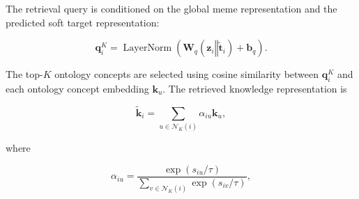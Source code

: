 \documentclass[11pt]{article}
\begin{document}
The retrieval query is conditioned on the global meme representation
and the predicted soft target representation:

\begin{equation}
\mathbf{q}^{K}_i
=
\operatorname{LayerNorm}
\left(
\mathbf{W}_{q}
\left(
\mathbf{z}_i
\mathbin{\Vert}
\widetilde{\mathbf{t}}_i
\right)
+
\mathbf{b}_{q}
\right).
\label{eq:retrieval-query}
\end{equation}

The top-$K$ ontology concepts are selected using cosine similarity
between $\mathbf{q}^{K}_i$ and each ontology concept embedding
$\mathbf{k}_u$. The retrieved knowledge representation is

\begin{equation}
\widetilde{\mathbf{k}}_i
=
\sum_{u \in \mathcal{N}_{K}(i)}
\alpha_{iu}\mathbf{k}_u,
\label{eq:retrieved-knowledge}
\end{equation}

where

\begin{equation}
\alpha_{iu}
=
\frac{
\exp(s_{iu}/\tau)
}{
\sum_{v \in \mathcal{N}_{K}(i)}
\exp(s_{iv}/\tau)
},
\label{eq:knowledge-weight}
\end{equation}
\end{document}
